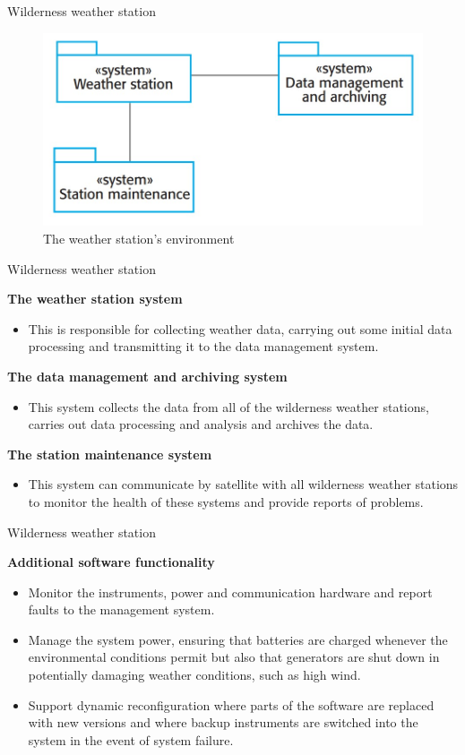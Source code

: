\documentclass{beamer}
\begin{document}
\begin{frame}{Wilderness weather station}
	\begin{figure}
		\includegraphics[scale=.45]{img/m1_4.jpg}
		\caption{The weather 
			station’s environment}
	\end{figure}
\end{frame}
\begin{frame}{Wilderness weather station}
	
\textbf{The weather station system }
\begin{itemize}
	\item This is responsible for collecting weather data, carrying out some initial data 
	processing and transmitting it to the data management system.
\end{itemize}
\textbf{The data management and archiving system }
\begin{itemize}
	\item This system collects the data from all of the wilderness weather stations, carries out 
	data processing and analysis and archives the data.
\end{itemize}
\textbf{The station maintenance system }
\begin{itemize}
	\item This system can communicate by satellite with all wilderness weather stations to 
	monitor the health of these systems and provide reports of problems.
\end{itemize}
\end{frame}
\begin{frame}{Wilderness weather station}
	
	\textbf{Additional software functionality}
	\begin{itemize}
		\item Monitor the instruments, power and communication hardware and report faults to the management system.
		\item Manage the system power, ensuring that batteries are charged whenever the environmental conditions permit but also that generators are shut down in potentially damaging weather conditions, such as high wind.
		\item Support dynamic reconfiguration where parts of the software are replaced with new versions and where backup instruments are switched into the system in the event of system failure.
	\end{itemize}
\end{frame}
\end{document}
